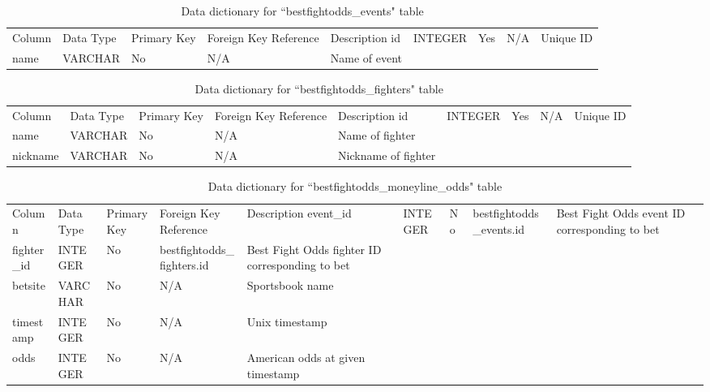 \documentclass[12pt,twoside]{report}
\begin{document}
\tiny
\begin{longtable}{lllll}
\caption{Data dictionary for ``bestfightodds\_events" table}\\ 
\toprule
Column & Data Type & Primary Key & Foreign Key Reference & Description    \endfirsthead 
\toprule
id     & INTEGER   & Yes         & N/A                   & Unique ID      \\
name   & VARCHAR   & No          & N/A                   & Name of event  \\
\bottomrule
\end{longtable}
\normalsize


\tiny
\begin{longtable}{lllll}
\caption{Data dictionary for ``bestfightodds\_fighters" table}\\ 
\toprule
Column   & Data Type & Primary Key & Foreign Key Reference & Description                         \endfirsthead 
\toprule
id       & INTEGER   & Yes         & N/A                   & Unique ID                           \\
name     & VARCHAR   & No          & N/A                   & Name of fighter                     \\
nickname & VARCHAR   & No          & N/A                   & Nickname of fighter  \\
\bottomrule
\end{longtable}
\normalsize

\tiny
\begin{longtable}{lllll}
\caption{Data dictionary for ``bestfightodds\_moneyline\_odds" table}\\ 
\toprule
Column      & Data Type & Primary Key & Foreign Key Reference      & Description                                      \endfirsthead 
\toprule
event\_id   & INTEGER   & No          & bestfightodds\_events.id   & Best Fight Odds event ID corresponding to bet    \\
fighter\_id & INTEGER   & No          & bestfightodds\_fighters.id & Best Fight Odds fighter ID corresponding to bet  \\
betsite     & VARCHAR   & No          & N/A                        & Sportsbook name                                  \\
timestamp   & INTEGER   & No          & N/A                        & Unix timestamp                                   \\
odds        & INTEGER   & No          & N/A                        & American odds at given timestamp                 \\
\bottomrule
\end{longtable}
\normalsize
\end{document}
